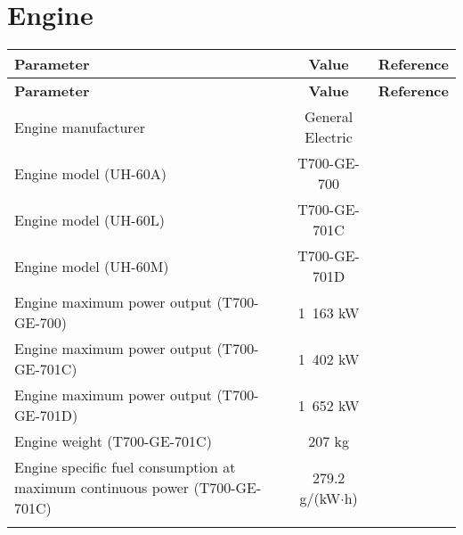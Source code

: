 \section{Engine}

\begin{tabularx}{\textwidth}{ | L | c | c | }
  \hline
  \textbf{Parameter}                    & \textbf{Value}   & \textbf{Reference} \\ \hline
  \endfirsthead
  \hline
  \textbf{Parameter}                    & \textbf{Value}   & \textbf{Reference} \\ \hline
  \endhead
  Engine manufacturer                   & General Electric & \cite{Janes20042005} \\ \hline
  Engine model (UH-60A)                 & T700-GE-700      & \cite{Janes20042005,UH60_OperatorsManual} \\ \hline
  Engine model (UH-60L)                 & T700-GE-701C     & \cite{Janes20042005,UH60_OperatorsManual} \\ \hline
  Engine model (UH-60M)                 & T700-GE-701D     & \cite{Janes20042005} \\ \hline
  Engine maximum power output (T700-GE-700)  & 1~163 kW    & \cite{Janes20042005} \\ \hline
  Engine maximum power output (T700-GE-701C) & 1~402 kW    & \cite{Janes20042005} \\ \hline
  Engine maximum power output (T700-GE-701D) & 1~652 kW    & \cite{Janes20042005} \\ \hline
  Engine weight (T700-GE-701C)          & 207 kg           & \cite{UH60_GE_T700_DataSheet} \\ \hline
  Engine specific fuel consumption at maximum continuous power (T700-GE-701C) & 279.2 g/(kW$\cdot$h) & \cite{UH60_GE_T700_DataSheet} \\ \hline
  \caption{Basic data}
\end{tabularx}
